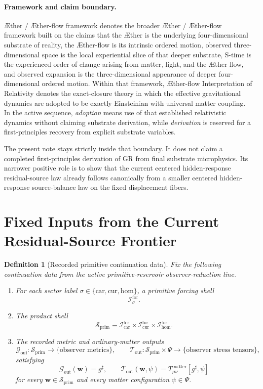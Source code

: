 \documentclass[11pt]{article}
\newcommand{\Aether}{\AE{}ther}
\newcommand{\Aflow}{\AE{}ther-flow}
\newcommand{\TheoryName}{\Aflow{} Interpretation of Relativity}
\newcommand{\TheoryProgram}{\Aether{} / \Aflow{} framework}
\newcommand{\CompletedMetric}{g^{\sharp}}
\newcommand{\MatterSpace}{\Psi}
\newcommand{\Car}{\mathrm{car}}
\newcommand{\Cur}{\mathrm{cur}}
\newcommand{\Hom}{\mathrm{hom}}
\newcommand{\ForSpace}[1]{\mathcal I_{#1}^{\mathrm{for}}}
\newcommand{\PrimShell}{\mathcal S_{\mathrm{prim}}}
\newcommand{\MetricOut}{\mathscr G_{\mathrm{out}}}
\newcommand{\MatterOut}{\mathscr T_{\mathrm{out}}}
\newtheorem{definition}{Definition}
\begin{document}
\paragraph{Framework and claim boundary.}
\TheoryProgram{} denotes the broader \Aether{} / \Aflow{} framework built on the claims that the \Aether{} is the underlying four-dimensional substrate of reality, the \Aflow{} is its intrinsic ordered motion, observed three-dimensional space is the local experiential slice of that deeper substrate, S-time is the experienced order of change arising from matter, light, and the \Aflow{}, and observed expansion is the three-dimensional appearance of deeper four-dimensional ordered motion. Within that framework, \TheoryName{} denotes the exact-closure theory in which the effective gravitational dynamics are adopted to be exactly Einsteinian with universal matter coupling. In the active sequence, \emph{adoption} means use of that established relativistic dynamics without claiming substrate derivation, while \emph{derivation} is reserved for a first-principles recovery from explicit substrate variables.

The present note stays strictly inside that boundary. It does not claim a completed first-principles derivation of GR from final substrate microphysics. Its narrower positive role is to show that the current centered hidden-response residual-source law already follows canonically from a smaller centered hidden-response source-balance law on the fixed displacement fibers.

\section{Fixed Inputs from the Current Residual-Source Frontier}

\begin{definition}[Recorded primitive continuation data]
\label{def:fixed}
Fix the following continuation data from the active primitive-reservoir observer-reduction line.
\begin{enumerate}
    \item For each sector label \(\sigma\in\{\Car,\Cur,\Hom\}\), a primitive forcing shell
    \[
    \ForSpace{\sigma}.
    \]
    \item The product shell
    \[
    \PrimShell
    \equiv
    \ForSpace{\Car}\times \ForSpace{\Cur}\times \ForSpace{\Hom}.
    \]
    \item The recorded metric and ordinary-matter outputs
    \[
    \MetricOut:\PrimShell\to\{\text{observer metrics}\},
    \qquad
    \MatterOut:\PrimShell\times\MatterSpace\to\{\text{observer stress tensors}\},
    \]
    satisfying
    \begin{equation}
    \MetricOut(\mathbf w)=\CompletedMetric,
    \qquad
    \MatterOut(\mathbf w,\psi)
    =
    T_{\mu\nu}^{\mathrm{matter}}[\CompletedMetric,\psi]
    \label{eq:fixedoutputs}
    \end{equation}
    for every \(\mathbf w\in\PrimShell\) and every matter configuration \(\psi\in\MatterSpace\).
\end{enumerate}
\end{definition}
\end{document}
